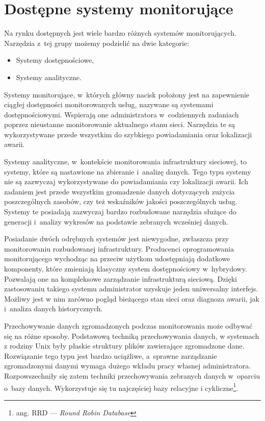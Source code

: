 \chapter{Dostępne systemy monitorujące}
\label{chap:Systemy}

Na rynku dostępnych jest wiele bardzo różnych systemów
monitorujących. Narzędzia z~tej grupy możemy podzielić na dwie
kategorie:

\begin{itemize}
\item Systemy dostępnościowe,
\item Systemy analityczne.
\end{itemize}

Systemy monitorujące, w~których główny nacisk położony jest na
zapewnienie ciągłej dostępności monitorowanych usług, nazywane są
systemami dostępnościowymi. Wspierają one administratora
w~codziennych zadaniach poprzez nieustanne monitorowanie aktualnego
stanu sieci. Narzędzia te są wykorzystywane przede wszystkim do
szybkiego powiadamiania oraz lokalizacji awarii.

Systemy analityczne, w~kontekście monitorowania infrastruktury
sieciowej, to systemy, które są nastawione na zbieranie i~analizę
danych. Tego typu systemy nie są zazwyczaj wykorzystywane
do powiadamiania czy lokalizacji awarii. Ich zadaniem jest przede
wszystkim gromadzenie danych dotyczących zużycia poszczególnych
zasobów, czy też wskaźników jakości poszczególnych usług. Systemy te
posiadają zazwyczaj bardzo rozbudowane narzędzia służące do generacji
i~analizy wykresów na podstawie zebranych wcześniej danych.

Posiadanie dwóch odrębnych systemów jest niewygodne, zwłaszcza przy
monitorowaniu rozbudowanej infrastruktury. Producenci oprogramowania
monitorującego wychodząc na przeciw użytkom udostępniają dodatkowe
komponenty, które zmieniają klasyczny system dostępnościowy
w~hybrydowy. Pozwalają one na kompleksowe zarządzanie infrastrukturą
sieciową. Dzięki zastosowaniu takiego systemu administrator uzyskuje
jeden uniwersalny interfejs. Możliwy jest w nim zarówno pogląd
bieżącego stan sieci oraz diagnoza awarii, jak i~analiza danych
historycznych.

Przechowywanie danych zgromadzonych podczas monitorowania może odbywać
się na różne sposoby. Podstawową techniką przechowywania danych, w
systemach z rodziny Unix były płaskie struktury plików zawierające
zgromadzone dane. Rozwiązanie tego typu jest bardzo uciążliwe,
a~sprawne zarządzanie zgromadzonymi danymi wymaga dużego wkładu pracy
własnej administratora. Rozpowszechniły się zatem techniki
przechowywania zebranych danych w~oparciu o~bazy danych. Wykorzystuje
się tu najczęściej bazy relacyjne i cykliczne\footnote{ang. RRD --- {\em Round
    Robin Database}}.

